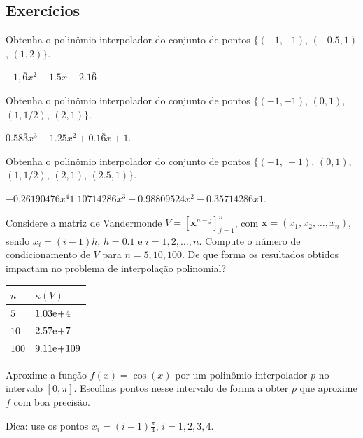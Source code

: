 \subsection{Exercícios}

\begin{exer}
  Obtenha o polinômio interpolador do conjunto de pontos 
  $\{(-1, -1)$, $(-0.5, 1)$, $(1, 2)\}$.
\end{exer}
\begin{resp}
  $-1,\bar{6}x^2 + 1.5x + 2.1\bar{6}$
\end{resp}

\begin{exer}
  Obtenha o polinômio interpolador do conjunto de pontos $\{(-1, -1)$, $(0, 1)$, $(1, 1/2)$, $(2, 1)\}$.
\end{exer}
\begin{resp}
  $0.58\bar{3}x^3 - 1.25x^2 + 0.1\bar{6}x + 1$. 
\end{resp}

\begin{exer}
  Obtenha o polinômio interpolador do conjunto de pontos $\{(-1,~-1)$, $(0, 1)$, $(1, 1/2)$, $(2, 1)$, $(2.5, 1)\}$.
\end{exer}
\begin{resp}
  $-0.26190476x^4  1.10714286x^3 -0.98809524x^2 -0.35714286x  1$.  
\end{resp}

\begin{exer}
  Considere a matriz de Vandermonde $V = [\pmb{x}^{n-j}]_{j=1}^{n}$, com $\pmb{x} = (x_1, x_2, \dotsc, x_n)$, sendo $x_i = (i-1)h$, $h=0.1$ e $i = 1, 2, \dotsc, n$. Compute o número de condicionamento de $V$ para $n=5, 10, 100$. De que forma os resultados obtidos impactam no problema de interpolação polinomial?
\end{exer}
\begin{resp}
  \begin{tabular}{ll}
    $n$ & $\kappa(V)$\\\hline
    $5$ & $1.03\mathrm{e}\!+\!4$\\
    $10$ & $2.57\mathrm{e}\!+\!7$\\
    $100$ & $9.11\mathrm{e}\!+\!109$\\\hline
  \end{tabular}
\end{resp}

\begin{exer}
  Aproxime a função $f(x) = \cos(x)$ por um polinômio interpolador $p$ no intervalo $[0, \pi]$. Escolhas pontos nesse intervalo de forma a obter $p$ que aproxime $f$ com boa precisão.
\end{exer}
\begin{resp}
  Dica: use os pontos $x_i = (i-1)\frac{\pi}{4}$, $i = 1, 2, 3, 4$.
\end{resp}

